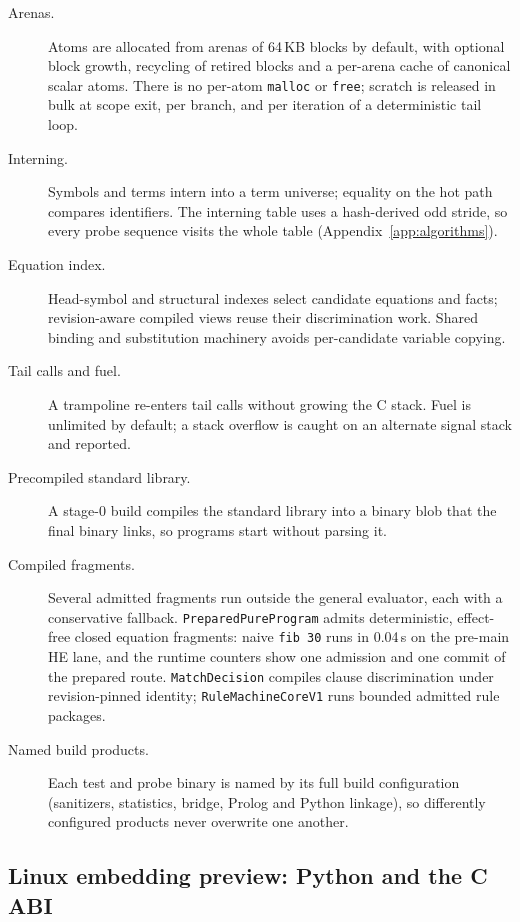\documentclass[11pt]{article}
\newcommand{\code}[1]{\texttt{#1}}
\newcommand{\HE}{\textup{HE}}
\begin{document}
\begin{description}
\item[Arenas.] Atoms are allocated from arenas of 64\,KB blocks by default,
  with optional block growth, recycling of retired blocks and a per-arena
  cache of canonical scalar atoms.  There is no per-atom \code{malloc} or
  \code{free}; scratch is released in bulk at scope exit, per branch, and per
  iteration of a deterministic tail loop.
\item[Interning.] Symbols and terms intern into a term universe; equality on
  the hot path compares identifiers.  The interning table uses a
  hash-derived odd stride, so every probe sequence visits the whole table
  (Appendix~\ref{app:algorithms}).
\item[Equation index.] Head-symbol and structural indexes select candidate equations and facts;
  revision-aware compiled views reuse their discrimination work.  Shared
  binding and substitution machinery avoids per-candidate variable copying.
\item[Tail calls and fuel.] A trampoline re-enters tail calls without growing
  the C stack.  Fuel is unlimited by default; a stack overflow is caught on an
  alternate signal stack and reported.
\item[Precompiled standard library.] A stage-0 build compiles the standard
  library into a binary blob that the final binary links, so programs start
  without parsing it.
\item[Compiled fragments.] Several admitted fragments run outside the general
  evaluator, each with a conservative fallback.  \code{PreparedPureProgram}
  admits deterministic, effect-free closed equation fragments: naive
  \code{fib 30} runs in 0.04\,s on the pre-main \HE{} lane, and the runtime
  counters show one admission and one commit of the prepared route.
  \code{MatchDecision} compiles clause discrimination under revision-pinned
  identity; \code{RuleMachineCoreV1} runs bounded admitted rule packages.
\item[Named build products.] Each test and probe binary is named by its full
  build configuration (sanitizers, statistics, bridge, Prolog and Python
  linkage), so differently configured products never overwrite one another.
\end{description}

\subsection{Linux embedding preview: Python and the C ABI}
\label{sec:embedding-preview}
\end{document}
